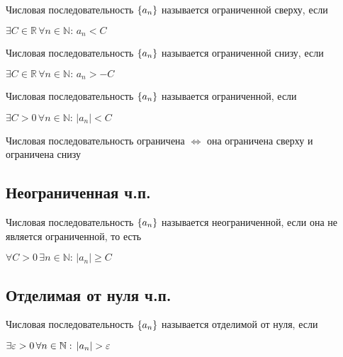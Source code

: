 {
    Числовая последовательность $ \{ a_n \} $ называется ограниченной сверху, если

    $ \exists C \in \mathbb{R} \, \forall n \in \mathbb{N}: \, a_n < C $
}

{
    Числовая последовательность $ \{ a_n \} $ называется ограниченной снизу, если

    $ \exists C \in \mathbb{R} \, \forall n \in \mathbb{N}: \, a_n > -C $
}

{
    Числовая последовательность $ \{ a_n \} $ называется ограниченной, если

    $ \exists C > 0 \, \forall n \in \mathbb{N}: \, | a_n | < C $
}


\nt
{
    Числовая последовательность ограничена $ \iff $ она ограничена сверху и ограничена снизу
}

\subsection{Неограниченная ч.п.}

{
    Числовая последовательность $ \{ a_n \} $ называется неограниченной, если она не является ограниченной, то есть

    $ \forall C > 0 \, \exists n \in \mathbb{N}: \, | a_n | \ge C $
}


\subsection{Отделимая от нуля ч.п.}

{
    Числовая последовательность $ \{ a_n \} $ называется отделимой от нуля, если

    $ \exists \varepsilon > 0 \, \forall n \in \mathbb{N}: \, | a_n | > \varepsilon $
}


